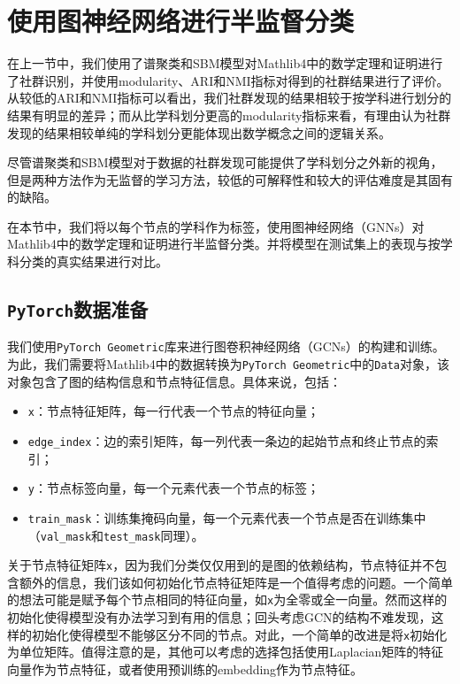 \graphicspath{{../graph_nn/fig/}}
\section{使用图神经网络进行半监督分类}
在上一节中，我们使用了谱聚类和SBM模型对Mathlib4中的数学定理和证明进行了社群识别，并使用modularity、ARI和NMI指标对得到的社群结果进行了评价。从较低的ARI和NMI指标可以看出，我们社群发现的结果相较于按学科进行划分的结果有明显的差异；而从比学科划分更高的modularity指标来看，有理由认为社群发现的结果相较单纯的学科划分更能体现出数学概念之间的逻辑关系。

尽管谱聚类和SBM模型对于数据的社群发现可能提供了学科划分之外新的视角，但是两种方法作为无监督的学习方法，较低的可解释性和较大的评估难度是其固有的缺陷。

在本节中，我们将以每个节点的学科作为标签，使用图神经网络（GNNs）对Mathlib4中的数学定理和证明进行半监督分类。并将模型在测试集上的表现与按学科分类的真实结果进行对比。

\subsection{\texttt{PyTorch}数据准备}
我们使用\texttt{PyTorch Geometric}库来进行图卷积神经网络（GCNs）的构建和训练。为此，我们需要将Mathlib4中的数据转换为\texttt{PyTorch Geometric}中的\texttt{Data}对象，该对象包含了图的结构信息和节点特征信息。具体来说，包括：
\begin{itemize}
    \item \texttt{x}：节点特征矩阵，每一行代表一个节点的特征向量；
    \item \texttt{edge\_index}：边的索引矩阵，每一列代表一条边的起始节点和终止节点的索引；
    \item \texttt{y}：节点标签向量，每一个元素代表一个节点的标签；
    \item \texttt{train\_mask}：训练集掩码向量，每一个元素代表一个节点是否在训练集中（\texttt{val\_mask}和\texttt{test\_mask}同理）。
\end{itemize}

关于节点特征矩阵\texttt{x}，因为我们分类仅仅用到的是图的依赖结构，节点特征并不包含额外的信息，我们该如何初始化节点特征矩阵是一个值得考虑的问题。一个简单的想法可能是赋予每个节点相同的特征向量，如\texttt{x}为全零或全一向量。然而这样的初始化使得模型没有办法学习到有用的信息；回头考虑GCN的结构不难发现，这样的初始化使得模型不能够区分不同的节点。对此，一个简单的改进是将\texttt{x}初始化为单位矩阵。值得注意的是，其他可以考虑的选择包括使用Laplacian矩阵的特征向量作为节点特征，或者使用预训练的embedding作为节点特征。

